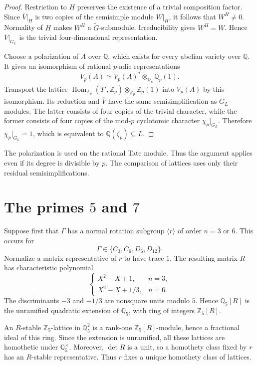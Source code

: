 \documentclass[11pt]{article}
\newcommand{\Q}{\mathbb Q}
\newcommand{\Z}{\mathbb Z}
\begin{document}
\begin{proof}
Restriction to \(H\) preserves the existence of a trivial
composition factor. Since \(\overline V|_H\) is two copies of
the semisimple module \(W|_H\), it follows that \(W^H\neq0\).
Normality of \(H\) makes \(W^H\) a \(\widetilde G\)-submodule.
Irreducibility gives \(W^H=W\). Hence \(\overline V|_{G_L}\)
is the trivial four-dimensional representation.

Choose a polarization of \(A\) over \(\Q\), which exists for every
abelian variety over \(\Q\). It gives an isomorphism of rational
\(p\)-adic representations
\[
 V_p(A)\simeq V_p(A)^*\otimes_{\Q_p}\Q_p(1).
\]
Transport the lattice
\(\operatorname{Hom}_{\Z_p}(T',\Z_p)\otimes_{\Z_p}\Z_p(1)\)
into \(V_p(A)\) by this isomorphism. Its reduction and
\(\overline V\) have the same semisimplification as
\(G_L\)-modules. The latter consists of four copies of the trivial
character, while the former consists of four copies of the
mod-\(p\) cyclotomic character \(\chi_p|_{G_L}\). Therefore
\(\chi_p|_{G_L}=1\), which is equivalent to
\(\Q(\zeta_p)\subseteq L\).
\end{proof}

The polarization is used on the rational Tate module. Thus the
argument applies even if its degree is divisible by \(p\). The
comparison of lattices uses only their residual
semisimplifications.

\section{The primes \(5\) and \(7\)}

Suppose first that \(\Gamma\) has a normal rotation subgroup
\(\langle r\rangle\) of order \(n=3\) or \(6\). This occurs for
\[
 \Gamma\in\{C_3,C_6,D_6,D_{12}\}.
\]
Normalize a matrix representative of \(r\) to have trace \(1\).
The resulting matrix \(R\) has characteristic polynomial
\[
 \begin{cases}
  X^2-X+1,&n=3,\\
  X^2-X+1/3,&n=6.
 \end{cases}
\]
The discriminants \(-3\) and \(-1/3\) are nonsquare units modulo
\(5\). Hence \(\Q_5[R]\) is the unramified quadratic extension
of \(\Q_5\), with ring of integers \(\Z_5[R]\).

An \(R\)-stable \(\Z_5\)-lattice in \(\Q_5^2\) is a
rank-one \(\Z_5[R]\)-module, hence a fractional ideal of this ring.
Since the extension is unramified, all these lattices are
homothetic under \(\Q_5^\times\). Moreover, \(\det R\) is a unit,
so a homothety class fixed by \(r\) has an \(R\)-stable
representative. Thus \(r\) fixes a unique homothety class of
lattices.
\end{document}
